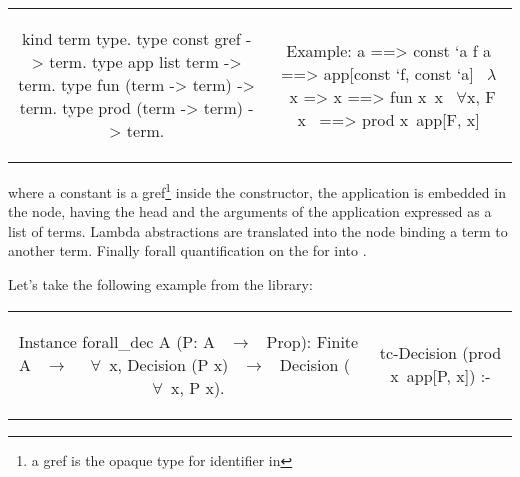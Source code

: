 \documentclass{rapport}
\begin{document}
\noindent %
\begin{tabular}{c|c}
  \begin{minipage}[c]{0.50\linewidth}
    \begin{elpicode}
      kind term type.
      type const gref -> term.
      type app list term -> term.
      type fun (term -> term) -> term.
      type prod (term -> term) -> term.
    \end{elpicode}
  \end{minipage}
  &
  \begin{minipage}[c]{0.48\linewidth}
    \begin{textcode}
      Example:
      a       ==> const `a
      f a     ==> app[const `f, const `a]
      ~$\lambda$~x => x ==> fun x\ x
      ~$\forall$x, F x~ ==> prod x\ app[F, x]
    \end{textcode}
  \end{minipage}
\end{tabular}


\noindent where a \coq constant is a gref\footnote{a gref is the opaque type for \coq
identifier in \elpi} inside the  constructor, the \coq application
is embedded in the  node, having the head and the arguments of the
application expressed as a list of terms. Lambda abstractions are translated
into the node  binding a term to another term. Finally forall
quantification on the for  into .


Let's take the following example from the \stdpp library:

\noindent %
\begin{tabular}{c|c}
  \begin{minipage}[c]{0.50\linewidth}
    \begin{coqcode}
      Instance forall_dec A (P: A ~$\to$~ Prop):
        Finite A ~$\to$~ 
        ~$\forall$~x, Decision (P x) ~$\to$~
        Decision (~$\forall$~x, P x).
    \end{coqcode}
  \end{minipage}
  &
  \begin{minipage}[c]{0.46\linewidth}
    \begin{elpicode}
      tc-Decision (prod x\ app[P, x]) :- 
    \end{elpicode}
  \end{minipage}
\end{tabular}
\end{document}
